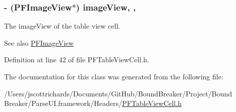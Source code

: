 \subsubsection[{image\+View}]{\setlength{\rightskip}{0pt plus 5cm}-\/ ({\bf P\+F\+Image\+View}$\ast$) image\+View\hspace{0.3cm}{\ttfamily [read]}, {\ttfamily [nonatomic]}, {\ttfamily [strong]}}\label{interface_p_f_table_view_cell_a7a0539734c5a2d002fba791497adbfa2}
The image\+View of the table view cell.

\begin{DoxySeeAlso}{See also}
\hyperlink{interface_p_f_image_view}{P\+F\+Image\+View} 
\end{DoxySeeAlso}


Definition at line 42 of file P\+F\+Table\+View\+Cell.\+h.



The documentation for this class was generated from the following file\+:\begin{DoxyCompactItemize}
\item 
/\+Users/jscottrichards/\+Documents/\+Git\+Hub/\+Bound\+Breaker/\+Project/\+Bound Breaker/\+Parse\+U\+I.\+framework/\+Headers/\hyperlink{_p_f_table_view_cell_8h}{P\+F\+Table\+View\+Cell.\+h}\end{DoxyCompactItemize}

